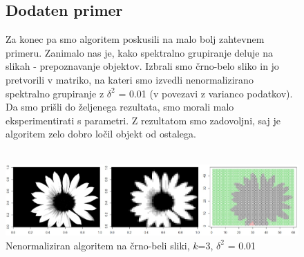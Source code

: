 \documentclass[a4paper, 10pt]{article}
\begin{document}
\begin{figure} [h]
\subsection{Dodaten primer}
Za konec pa smo algoritem poskusili na malo bolj zahtevnem primeru. Zanimalo nas je, kako spektralno grupiranje deluje na slikah - prepoznavanje objektov. Izbrali smo črno-belo sliko in jo pretvorili v matriko, na kateri smo izvedli nenormalizirano spektralno grupiranje z $\delta^2$ = 0.01 (v povezavi z varianco podatkov). Da smo prišli do željenega rezultata, smo morali malo eksperimentirati s parametri. Z rezultatom smo zadovoljni, saj je algoritem zelo dobro ločil objekt od ostalega.\\
\\
\caption{Nenormaliziran algoritem na črno-beli sliki, $k$=3, $\delta^2$ = 0.01}
\includegraphics[width=\textwidth]{roza}
\end{figure}
\end{document}
